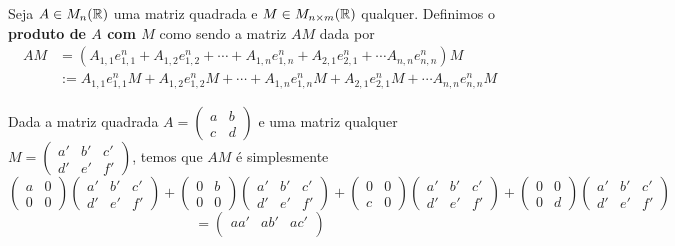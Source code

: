 \begin{df}
	Seja $A\in M_n(\mathbb R)$ uma matriz quadrada e $M\in M_{n\times m}(\mathbb R)$ qualquer. Definimos o \textbf{produto de $A$ com $M$} como sendo a matriz $AM$ dada por
	\begin{align*}
	AM&=(A_{1,1}e^n_{1,1}+A_{1,2}e^n_{1,2}+\cdots+A_{1,n}e^n_{1,n}+A_{2,1}e^n_{2,1}+\cdots A_{n,n}e^n_{n,n})M\\&:=A_{1,1}e^n_{1,1}M+A_{1,2}e^n_{1,2}M+\cdots+A_{1,n}e^n_{1,n}M+A_{2,1}e^n_{2,1}M+\cdots A_{n,n}e^n_{n,n}M
	\end{align*}
\end{df}

\begin{ex}
	Dada a matriz quadrada $A=\begin{pmatrix}
	a & b\\
	c & d
	\end{pmatrix}$ e uma matriz qualquer $M=\begin{pmatrix}
a' &b' & c'\\
d' & e' & f'
\end{pmatrix}$, temos que $AM$ é simplesmente
\[\begin{pmatrix}
a & 0\\
0 & 0
\end{pmatrix}\begin{pmatrix}
a' &b' & c'\\
d' & e' & f'
\end{pmatrix}+\begin{pmatrix}
0 & b\\
0 & 0
\end{pmatrix}\begin{pmatrix}
a' &b' & c'\\
d' & e' & f'
\end{pmatrix}+\begin{pmatrix}
0 & 0\\
c & 0
\end{pmatrix}\begin{pmatrix}
a' &b' & c'\\
d' & e' & f'
\end{pmatrix}+\begin{pmatrix}
0 & 0\\
0 & d
\end{pmatrix}\begin{pmatrix}
a' &b' & c'\\
d' & e' & f'
\end{pmatrix}\]
\[=\begin{pmatrix}
aa' &ab' & ac'\\

\end{pmatrix}\]
\end{ex}
